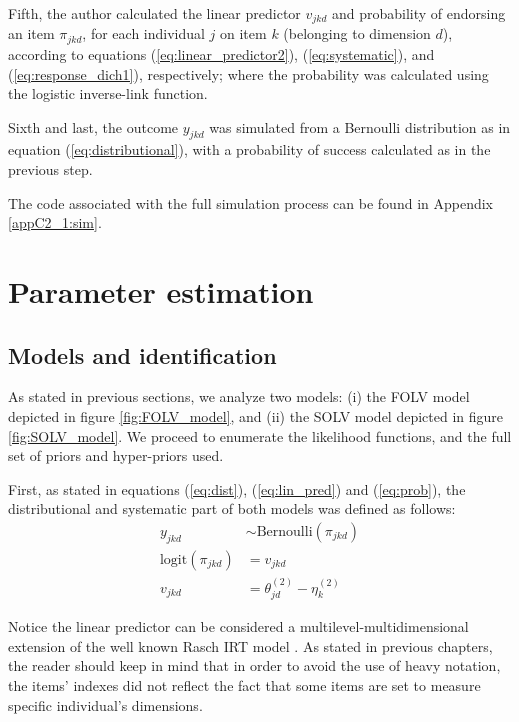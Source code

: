 Fifth, the author calculated the linear predictor $v_{jkd}$ and probability of endorsing an item $\pi_{jkd}$, for each individual $j$ on item $k$ (belonging to dimension $d$), according to equations (\ref{eq:linear_predictor2}), (\ref{eq:systematic}), and (\ref{eq:response_dich1}), respectively; where the probability was calculated using the logistic inverse-link function.
	
Sixth and last, the outcome $y_{jkd}$ was simulated from a Bernoulli distribution as in equation (\ref{eq:distributional}), with a probability of success calculated as in the previous step.

The code associated with the full simulation process can be found in Appendix \ref{appC2_1:sim}.


\section{Parameter estimation}

\subsection{Models and identification}

As stated in previous sections, we analyze two models: (i) the FOLV model depicted in figure \ref{fig:FOLV_model}, and (ii) the SOLV model depicted in figure \ref{fig:SOLV_model}. We proceed to enumerate the likelihood functions, and the full set of priors and hyper-priors used. 

First, as stated in equations (\ref{eq:dist}), (\ref{eq:lin_pred}) and (\ref{eq:prob}), the distributional and systematic part of both models was defined as follows:
%
\begin{align}
	y_{jkd} &\sim \text{Bernoulli}( \pi_{jkd} ) \\
	\text{logit}( \pi_{jkd} ) &= v_{jkd} \\
	v_{jkd} &= \theta^{(2)}_{jd} - \eta^{(2)}_{k}
\end{align}

Notice the linear predictor can be considered a multilevel-multidimensional extension of the well known Rasch IRT model \cite{Rasch_1980}. As stated in previous chapters, the reader should keep in mind that in order to avoid the use of heavy notation, the items' indexes did not reflect the fact that some items are set to measure specific individual's dimensions. 


